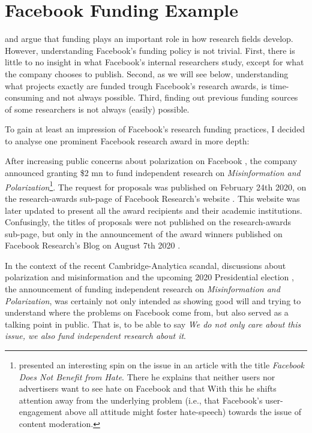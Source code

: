 \section{Facebook Funding Example}
\label{sec:fac_fund}
\citet{abdalla_grey_2021} and \citet{oreskes_why_2019} argue that funding plays an important role in how research fields develop.
However, understanding Facebook's funding policy is not trivial.
First, there is little to no insight in what Facebook's internal researchers study, except for what the company chooses to publish.
Second, as we will see below, understanding what projects exactly are funded trough Facebook's research awards, is time-consuming and not always possible.
Third, finding out previous funding sources of some researchers is not always (easily) possible.

To gain at least an impression of Facebook's research funding practices, I decided to analyse one prominent Facebook research award in more depth:

After increasing public concerns about polarization on Facebook \citep{seetharaman_facebook_2020}, the company announced granting \$2 \gls{mn} to fund independent research on \textit{Misinformation and Polarization}\footnote{\citet{clegg_facebook_2020} presented an interesting spin on the issue in an article with the title \emph{Facebook Does Not Benefit from Hate}. There he explains that neither users nor advertisers want to see hate on Facebook and that  With this he shifts attention away from the underlying problem (i.e., that Facebook's user-engagement above all attitude might foster hate-speech) towards the issue of content moderation.}.
The request for proposals was published on February 24th 2020, on the research-awards sub-page of Facebook Research's website \citep{facebook_research_foundational_2020}. 
This website was later updated to present all the award recipients and their academic institutions.
Confusingly, the titles of proposals were not published on the research-awards sub-page, but only in the announcement of the award winners published on Facebook Research's Blog on August 7th 2020 \citep{leavitt_announcing_2020}.

In the context of the recent Cambridge-Analytica scandal, discussions about polarization and misinformation and the upcoming 2020 Presidential election \citep{isaac_facebook_2019}, the announcement of funding independent research on \textit{Misinformation and Polarization}, was certainly not only intended as showing good will and trying to understand where the problems on Facebook come from, but also served as a talking point in public. That is, to be able to say \emph{We do not only care about this issue, we also fund independent research about it}.

